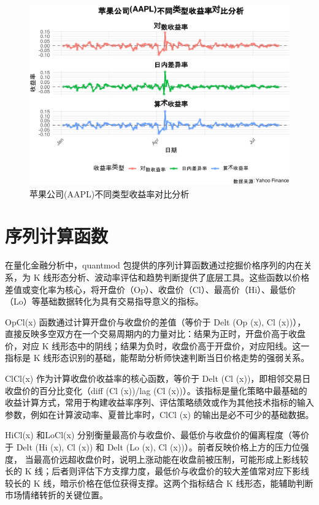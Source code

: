 \documentclass[]{ctexbook}
\begin{document}
\begin{figure}
\includegraphics[width=0.9\linewidth]{QuantmodHandbook_files/figure-latex/visdeltall-1} \caption{苹果公司(AAPL)不同类型收益率对比分析}\label{fig:visdeltall}
\end{figure}

\section{序列计算函数}\label{ux5e8fux5217ux8ba1ux7b97ux51fdux6570}

在量化金融分析中，quantmod 包提供的序列计算函数通过挖掘价格序列的内在关系，为 K 线形态分析、波动率评估和趋势判断提供了底层工具。这些函数以价格差值或变化率为核心，将开盘价（Op）、收盘价（Cl）、最高价（Hi）、最低价（Lo）等基础数据转化为具有交易指导意义的指标。

OpCl(x) 函数通过计算开盘价与收盘价的差值（等价于 Delt (Op (x), Cl (x))），直接反映多空双方在一个交易周期内的力量对比：结果为正时，开盘价高于收盘价，对应 K 线形态中的阴线；结果为负时，收盘价高于开盘价，对应阳线。这一指标是 K 线形态识别的基础，能帮助分析师快速判断当日价格走势的强弱关系。

ClCl(x) 作为计算收盘价收益率的核心函数，等价于 Delt (Cl (x))，即相邻交易日收盘价的百分比变化（diff (Cl (x))/lag (Cl (x))）。该指标是量化策略中最基础的收益计算方式，常用于构建收益率序列、评估策略绩效或作为其他技术指标的输入参数，例如在计算波动率、夏普比率时，ClCl (x) 的输出是必不可少的基础数据。

HiCl(x) 和LoCl(x) 分别衡量最高价与收盘价、最低价与收盘价的偏离程度（等价于 Delt (Hi (x), Cl (x)) 和 Delt (Lo (x), Cl (x))）。前者反映价格上方的压力位强度， 当最高价远超收盘价时，说明上涨动能在收盘前被压制，可能形成上影线较长的 K 线；后者则评估下方支撑力度，最低价与收盘价的较大差值常对应下影线较长的 K 线，暗示价格在低位获得支撑。这两个指标结合 K 线形态，能辅助判断市场情绪转折的关键位置。
\end{document}
